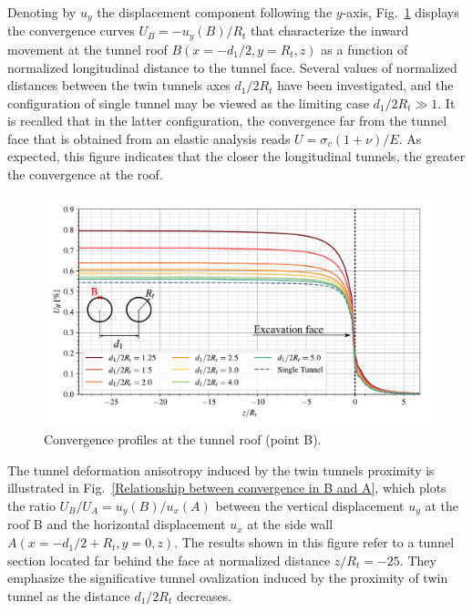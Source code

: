 \documentclass[Journal,letterpaper, NoLists,SectionNumbers]{ascelike-new}
\begin{document}
Denoting by $u_y$ the displacement component following the  $y$-axis, Fig.~\ref{Convergence Profiles in B} displays the convergence curves $U_B = -u_y(B)/R_t$ that characterize the inward movement at the tunnel roof $B(x=-d_1/2,y=R_t,z)$ as a function of normalized longitudinal distance to the tunnel face. Several values of normalized distances between the twin tunnels axes $d_1/2R_t$ have been investigated, and the configuration of single tunnel may be viewed as the limiting case $d_1/2R_t \gg 1$. It is recalled that in the latter configuration, the convergence far from the tunnel face that is obtained from an elastic analysis reads $U = \sigma_v(1+\nu)/E$. As expected, this figure indicates that the closer the longitudinal tunnels, the greater the convergence at the roof.
\begin{figure}[h!]
	\centering
	\includegraphics[scale=0.65]{Convergence Profiles in B.pdf}
	\caption{Convergence profiles at the tunnel roof (point B).}
	\label{Convergence Profiles in B}
\end{figure}

The tunnel deformation anisotropy induced by the twin tunnels proximity is illustrated in Fig.~\ref{Relationship between convergence in B and A}, which plots the ratio $U_B/U_A = u_y(B)/u_x(A)$ between the vertical displacement $u_y$ at the roof B and the horizontal displacement $u_x$ at the side wall  $A(x=-d_1/2+R_t, y = 0, z)$. The results shown in this figure refer to a tunnel section located far behind the face at normalized distance $z/R_t = -25$. They emphasize the significative tunnel ovalization induced by the proximity of twin tunnel as the distance $d_1/2R_t$ decreases. 
\end{document}
